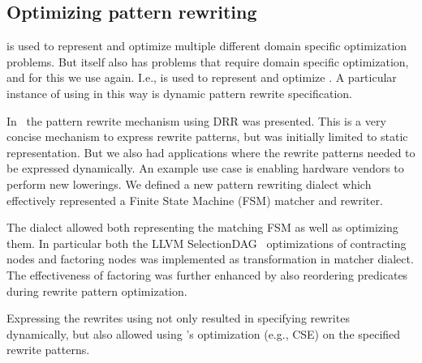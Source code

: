 \subsection{Optimizing \MLIR pattern rewriting}

\MLIR is used to represent and optimize multiple different domain specific
optimization problems. But \MLIR itself also has problems that require domain
specific optimization, and for this we use \MLIR again. I.e., \MLIR is used to
represent and optimize \MLIR. A particular instance of using \MLIR in this way
is dynamic pattern rewrite specification.

In~ the pattern rewrite mechanism using DRR was presented. This
is a very concise mechanism to express rewrite patterns, but was initially
limited to static representation. But we also had applications where the
rewrite patterns needed to be expressed dynamically. An example use case is
enabling hardware vendors to perform new lowerings. We defined a new pattern
rewriting dialect which effectively represented a Finite State Machine (FSM)
matcher and rewriter.

The dialect allowed both representing the matching FSM as well as optimizing
them. In particular both the LLVM SelectionDAG~\cite{selectiondag} optimizations
of contracting nodes and factoring nodes was implemented as transformation in
\MLIR matcher dialect. The effectiveness of factoring was further enhanced by
also reordering predicates during rewrite pattern optimization.

Expressing the rewrites using \MLIR not only resulted in specifying rewrites
dynamically, but also allowed using \MLIR's optimization (e.g., CSE) on the
specified rewrite patterns.
